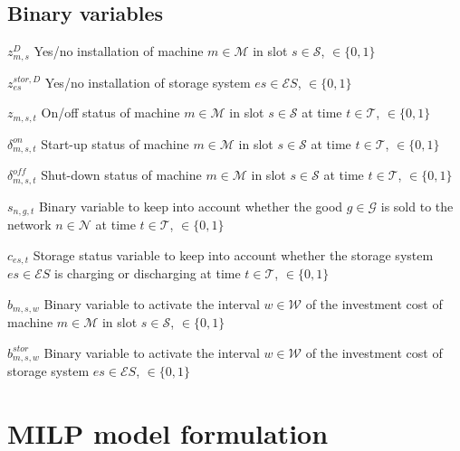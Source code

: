\documentclass{article}
\newcommand{\cT}{{\mathcal T}}
\newcommand{\cM}{{\mathcal M}}
\newcommand{\cS}{{\mathcal S}}
\newcommand{\cES}{{\mathcal ES}}
\newcommand{\cN}{{\mathcal N}}
\newcommand{\cG}{{\mathcal G}}
\newcommand{\cW}{{\mathcal W}}
\newcommand\mydescriptionopt{
	\IEEEsetlabelwidth{$g \in \cG_{\textit{off}}^0$]}
	\IEEEusemathlabelsep
}
\begin{document}
\subsection{Binary variables}
\begin{IEEEdescription}[\mydescriptionopt]
	\item[$z_{m, s}^D$] Yes/no installation of machine $m \in \cM$ in slot $s \in \cS$, $\in \{0,1\}$
	\item[$z_{es}^{stor, D}$] Yes/no installation of storage system $es \in \cES$, $\in \{0,1\}$
	
	\item[$z_{m, s, t}$] On/off status of machine $m \in \cM$ in slot $s \in \cS$ at time $t \in \cT$, $\in \{0,1\}$
	\item[$\delta_{m, s, t}^{on}$] Start-up status of machine $m \in \cM$ in slot $s \in \cS$ at time $t \in \cT$, $\in \{0,1\}$
	\item[$\delta_{m, s, t}^{off}$] Shut-down status of machine $m \in \cM$ in slot $s \in \cS$ at time $t \in \cT$, $\in \{0,1\}$
	
	\item[$s_{n, g, t}$] Binary variable to keep into account whether the good $g \in \cG$ is sold to the network $n \in \cN$ at time $t \in \cT$, $\in \{0,1\}$
	
	\item[$c_{es, t}$] Storage status variable to keep into account whether the storage system $es \in \cES$ is charging or discharging at time $t \in \cT$, $\in \{0,1\}$
	
	\item[$b_{m, s, w}$] Binary variable to activate the interval $w \in \cW$ of the investment cost of machine $m \in \cM$ in slot $s \in \cS$, $\in \{0,1\}$
	\item[$b_{m, s, w}^{stor}$] Binary variable to activate the interval $w \in \cW$ of the investment cost of storage system $es \in \cES$, $\in \{0,1\}$
	

\end{IEEEdescription}


\section{MILP model formulation}
\end{document}
